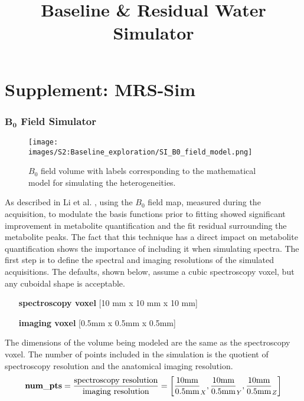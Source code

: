 \documentclass[AMA,LATO1COL]{WileyNJD-v2}
\title{Baseline \& Residual Water Simulator}
\begin{document}
    
    


\part*{Supplement: MRS-Sim}
\section{$\mathbold{B_0}$ Field Simulator}
\begin{figure}[h!]
    \centering
    \texttt{[image: images/S2:Baseline\_exploration/SI\_B0\_field\_model.png]}
    \caption{$B_0$ field volume with labels corresponding to the mathematical model for simulating the heterogeneities.}
    \label{fig:SI_B0 model}
\end{figure}

As described in Li et al. \cite{Li2015}, using the $B_0$ field map, measured during the acquisition, to modulate the basis functions prior to fitting showed significant improvement in metabolite quantification and the fit residual surrounding the metabolite peaks. The fact that this technique has a direct impact on metabolite quantification shows the importance of including it when simulating spectra. The first step is to define the spectral and imaging resolutions of the simulated acquisitions. The defaults, shown below, assume a cubic spectroscopy voxel, but any cuboidal shape is acceptable.

\begin{itemize}[labelindent=2cm, widest=spectroscopy voxel, leftmargin=*, align=left] 
    \item[\textbf{spectroscopy voxel}] \textnormal{[10 mm x  10 mm x 10 mm]}
    \item[\textbf{imaging voxel}] \textnormal{[0.5mm x 0.5mm x 0.5mm]}
\end{itemize}

The dimensions of the volume being modeled are the same as the spectroscopy voxel. The number of points included in the simulation is the quotient of spectroscopy resolution and the anatomical imaging resolution.
\begin{equation}
    \mathbf{num\_pts} = \frac{\textnormal{spectroscopy resolution}}{\textnormal{imaging resolution}}
    = \left[{\frac{\textnormal{10mm}}{\textnormal{0.5mm}}}_X, {\frac{\textnormal{10mm}}{\textnormal{0.5mm}}}_Y, {\frac{\textnormal{10mm}}{\textnormal{0.5mm}}}_Z\right]
\end{equation}
\end{document}
